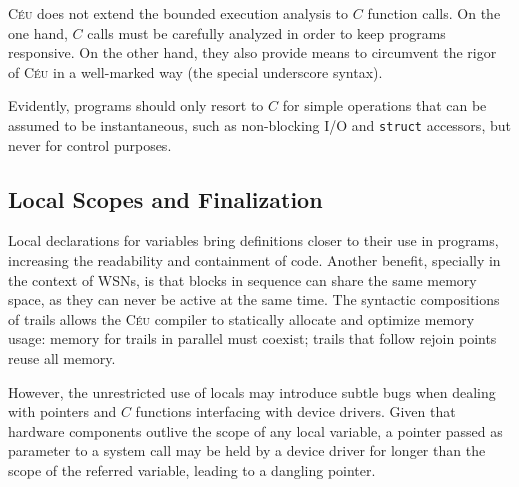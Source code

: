 \documentclass[letterpaper]{sig-alternate}
\newcommand{\code}[1] {{\small{\texttt{#1}}}}
\newcommand{\CEU}{\textsc{C\'{e}u}\xspace}
\begin{document}
\CEU does not extend the bounded execution analysis to $C$ function calls. 
On the one hand, $C$ calls must be carefully analyzed in order to keep programs 
responsive.
On the other hand, they also provide means to circumvent the rigor of \CEU in a 
well-marked way (the special underscore syntax).
%

%
Evidently, programs should only resort to $C$ for simple operations that can be 
assumed to be instantaneous, such as non-blocking I/O and \code{struct} 
accessors, but never for control purposes.

\subsection{Local Scopes and Finalization}
\label{sec.ceu.fins}

Local declarations for variables bring definitions closer to their use in 
programs, increasing the readability and containment of code.
Another benefit, specially in the context of WSNs, is that blocks in sequence 
can share the same memory space, as they can never be active at the same time.
%
The syntactic compositions of trails allows the \CEU compiler to statically 
allocate and optimize memory usage:
memory for trails in parallel must coexist;
trails that follow rejoin points reuse all memory.

However, the unrestricted use of locals may introduce subtle bugs when dealing 
with pointers and $C$ functions interfacing with device drivers.
Given that hardware components outlive the scope of any local variable, a 
pointer passed as parameter to a system call may be held by a device driver
for longer than the scope of the referred variable, leading to a dangling 
pointer.
\end{document}
